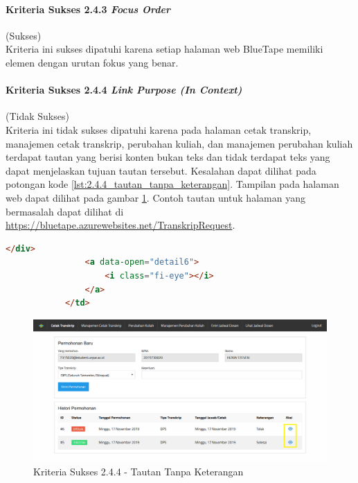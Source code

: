 \documentclass[a4paper,twoside]{article}
\begin{document}
\begin{enumerate}
		\paragraph{Kriteria Sukses 2.4.3 \textit{Focus Order}}
		\label{par:kepatuhan_bluetape_kriteria_sukses_2.4.3}
		(Sukses)\\

		Kriteria ini sukses dipatuhi karena setiap halaman web BlueTape memiliki elemen dengan urutan fokus yang benar. 

		\paragraph{Kriteria Sukses 2.4.4 \textit{Link Purpose (In Context)}}
		\label{par:kepatuhan_bluetape_kriteria_sukses_2.4.4}
		(Tidak Sukses)\\

		Kriteria ini tidak sukses dipatuhi karena pada halaman cetak transkrip, manajemen cetak transkrip, perubahan kuliah, dan manajemen perubahan kuliah terdapat tautan yang berisi konten bukan teks dan tidak terdapat teks yang dapat menjelaskan tujuan tautan tersebut. Kesalahan dapat dilihat pada potongan kode \ref{lst:2.4.4_tautan_tanpa_keterangan}. Tampilan pada halaman web dapat dilihat pada gambar \ref{fig:2.4.4_link_purpose_in_context}. Contoh tautan untuk halaman yang bermasalah dapat dilihat di \url{https://bluetape.azurewebsites.net/TranskripRequest}.

		\begin{lstlisting}[frame=single, label={lst:2.4.4_tautan_tanpa_keterangan}, language=HTML, caption=Kriteria Sukses 2.4.4 - Tautan Tanpa Keterangan]
				</div>
				<a data-open="detail6">
					<i class="fi-eye"></i>
				</a>
			</td>
		\end{lstlisting}

		\begin{figure}[H]
			\centering  
			\includegraphics[scale=0.3, frame]{kriteria-sukses-2-4-4-link-purpose-in-context}  
			\caption[Kriteria Sukses 2.4.4 - Tautan Tanpa Keterangan]{Kriteria Sukses 2.4.4 - Tautan Tanpa Keterangan}
			\label{fig:2.4.4_link_purpose_in_context}  
		\end{figure} 


\end{enumerate}
\end{document}

